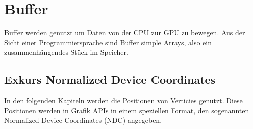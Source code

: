 
\section{Buffer}

Buffer werden genutzt um Daten von der CPU zur GPU zu bewegen. Aus der Sicht einer Programmiersprache sind Buffer simple Arrays, also ein zusammenhängendes Stück im Speicher.

\subsection{Exkurs Normalized Device Coordinates}
\label{sec:buffer:ndc}
In den folgenden Kapiteln werden die Positionen von Verticies genutzt. Diese Positionen werden in Grafik APIs in einem speziellen Format, den sogenannten Normalized Device Coordinates (NDC) angegeben.

